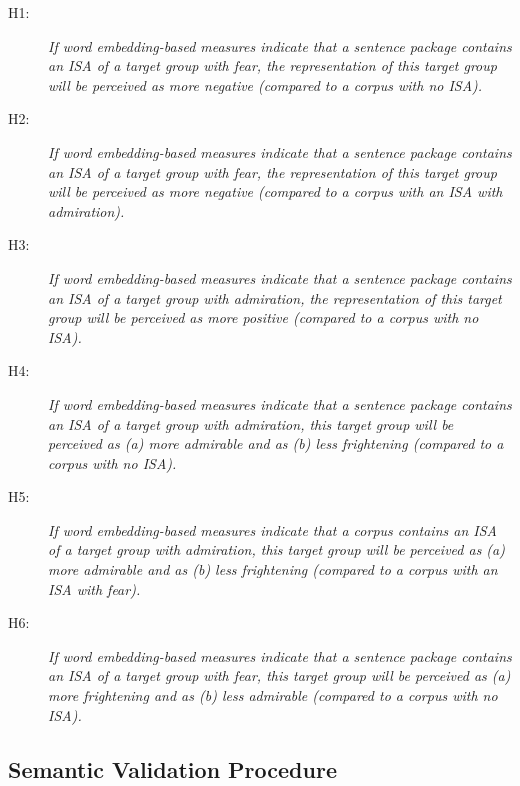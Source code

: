 \begin{description}
\item[H1:] \emph{If word embedding-based measures indicate that a sentence package contains an ISA of a target group with fear, the representation of this target group will be perceived as more negative (compared to a corpus with no ISA).}

\item[H2:] \emph{If word embedding-based measures indicate that a sentence package contains an ISA of a target group with fear, the representation of this target group will be perceived as more negative (compared to a corpus with an ISA with admiration).}

\item[H3:] \emph{If word embedding-based measures indicate that a sentence package contains an ISA of a target group with admiration, the representation of this target group will be perceived as more positive (compared to a corpus with no ISA).}

\item[H4:] \emph{If word embedding-based measures indicate that a sentence package contains an ISA of a target group with admiration, this target group will be perceived as (a) more admirable and as (b) less frightening (compared to a corpus with no ISA).}

\item[H5:] \emph{If word embedding-based measures indicate that a corpus contains an ISA of a target group with admiration, this target group will be perceived as (a) more admirable and as (b) less frightening (compared to a corpus with an ISA with fear).}

\item[H6:] \emph{If word embedding-based measures indicate that a sentence package contains an ISA of a target group with fear, this target group will be perceived as (a) more frightening and as (b) less admirable (compared to a corpus with no ISA).}

\end{description}

\subsection{Semantic Validation Procedure}

